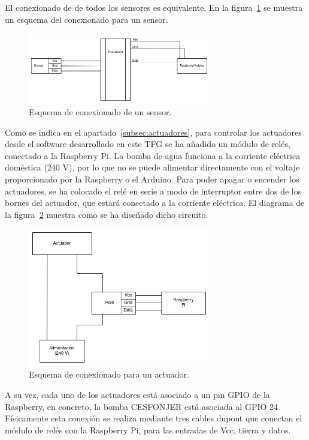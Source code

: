 \documentclass[a4paper, 12pt, oneside]{book}
\begin{document}
El conexionado de de todos los sensores es equivalente. En la figura~\ref{figura:conexion_sensor} se muestra un esquema del conexionado para un sensor.
\begin{figure}[H]
	\centering
    \includegraphics[width=8cm, keepaspectratio]{img/conexion_sensor}
    \caption{Esquema de conexionado de un sensor.}
    \label{figura:conexion_sensor}
\end{figure}


Como se indica en el apartado~\ref{subsec:actuadores}, para controlar los actuadores desde el software desarrollado en este TFG se ha añadido un módulo de relés, conectado a la Raspberry Pi. La bomba de agua funciona a la corriente eléctrica doméstica (240 V), por lo que no se puede alimentar directamente con el voltaje proporcionado por la Raspberry o el Arduino. Para poder apagar o encender los actuadores, se ha colocado el relé en serie a modo de interruptor entre dos de los bornes del actuador, que estará conectado a la corriente eléctrica.
El diagrama de la figura~\ref{figura:circuito_reles} muestra como se ha diseñado dicho circuito.

\begin{figure}[H]
	\centering
    \includegraphics[width=8cm, keepaspectratio]{img/circuito_reles}
    \caption{Esquema de conexionado para un actuador.}
    \label{figura:circuito_reles}
\end{figure}

A su vez, cada uno de los actuadores está asociado a un pin GPIO de la Raspberry, en concreto, la bomba CESFONJER está asociada al GPIO 24. Físicamente esta conexión se realiza mediante tres cables dupont que conectan el módulo de relés con la Raspberry Pi, para las entradas de Vcc, tierra y datos.
\end{document}
